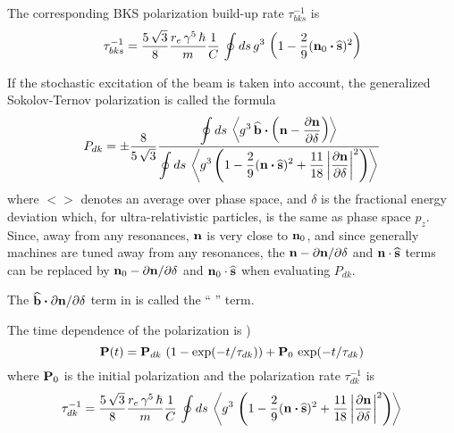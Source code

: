 The corresponding BKS polarization build-up rate $\tau_{bks}^{-1}$ is
\begin{equation}
  \tau_{bks}^{-1} = \frac{5 \, \sqrt{3}}{8} \frac{r_e \, \gamma^5 \, \hbar}{m} \frac{1}{C} \,
    \oint ds \, g^3 \, \left( 1 - \frac{2}{9} ({\bf n}_0 \mathbin{\boldsymbol{\cdot}} \widehat{{\bf s}})^2 \right)
  \label{tbks}
\end{equation}

If the stochastic excitation of the beam is taken into account, the generalized Sokolov-Ternov
polarization is called the  formula
\begin{equation}
  P_{dk} = \pm \frac{8}{5 \, \sqrt{3}}
  \frac{\displaystyle \oint ds \, \left< g^3 \, \widehat{{\bf b}} \mathbin{\boldsymbol{\cdot}} 
    \left( {\bf n} - \frac{\partial {\bf n}}{\partial \delta} \right) \right>}
  {\displaystyle \oint ds \, \left< g^3 \left( 1 - \frac{2}{9} ({\bf n} \mathbin{\boldsymbol{\cdot}} \widehat{{\bf s}})^2 + 
    \frac{11}{18} \left| \frac{\partial {\bf n}}{\partial \delta} \right|^2 \right) \right>}
  \label{pdk85}
\end{equation}
where $<>$ denotes an average over phase space, and $\delta$ is the fractional energy deviation
which, for ultra-relativistic particles, is the same as phase space $p_z$. Since, away from any
resonances, ${\bf n}$ is very close to ${\bf n}_0$, and since generally machines are tuned away from any
resonances, the ${\bf n} - \partial{\bf n}/\partial\delta$ and ${\bf n}\cdot\widehat{{\bf s}}$ terms can be replaced
by ${\bf n}_0 - \partial{\bf n}/\partial\delta$ and ${\bf n}_0\cdot\widehat{{\bf s}}$ when evaluating $P_{dk}$.

The $\widehat{{\bf b}} \mathbin{\boldsymbol{\cdot}} \partial{\bf n}/\partial\delta$ term in  is called the
`` '' term.

The time dependence of the polarization is \cite{b:barber99})
\begin{equation}
  {\bf P}(t) = {\bf P}_{dk} \, \left( 1 - \exp(-t/\tau_{dk}) \right) + {\bf P}_0 \, \exp(-t/\tau_{dk})
\end{equation}
where ${\bf P}_0$ is the initial polarization and the polarization rate $\tau_{dk}^{-1}$ is 
\begin{equation}
  \tau_{dk}^{-1} = \frac{5 \, \sqrt{3}}{8} \frac{r_e \, \gamma^5 \, \hbar}{m}
  \frac{1}{C} \, \oint ds \, \left< g^3 \, \left( 1 - \frac{2}{9} ({\bf n} \mathbin{\boldsymbol{\cdot}} \widehat{{\bf s}})^2 + 
  \frac{11}{18} \left| \frac{\partial {\bf n}}{\partial \delta} \right|^2 \right) \right>
  \label{t583}
\end{equation}

